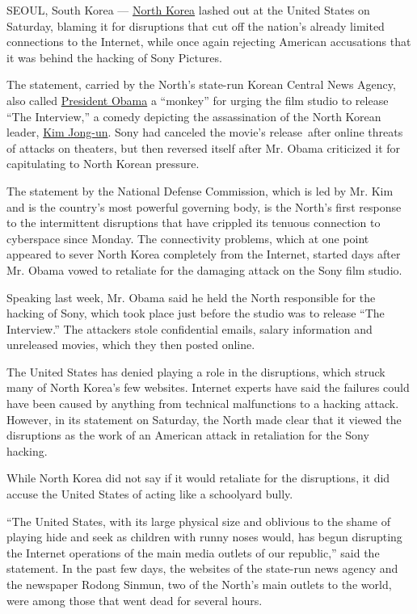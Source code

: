 SEOUL, South Korea ---
\href{http://topics.nytimes3xbfgragh.onion/top/news/international/countriesandterritories/northkorea/index.html?inline=nyt-geo}{North
Korea} lashed out at the United States on Saturday, blaming it for
disruptions that cut off the nation's already limited connections to the
Internet, while once again rejecting American accusations that it was
behind the hacking of Sony Pictures.

The statement, carried by the North's state-run Korean Central News
Agency, also called
\href{http://topics.nytimes3xbfgragh.onion/top/reference/timestopics/people/o/barack_obama/index.html?inline=nyt-per}{President
Obama} a ``monkey'' for urging the film studio to release ``The
Interview,'' a comedy depicting the assassination of the North Korean
leader,
\href{http://topics.nytimes3xbfgragh.onion/top/reference/timestopics/people/k/kim_jongun/index.html?inline=nyt-per}{Kim
Jong-un}. Sony had canceled the movie's release~after online threats of
attacks on theaters, but then reversed itself after Mr. Obama criticized
it for capitulating to North Korean pressure.

The statement by the National Defense Commission, which is led by Mr.
Kim and is the country's most powerful governing body, is the North's
first response to the intermittent disruptions that have crippled its
tenuous connection to cyberspace since Monday. The connectivity
problems, which at one point appeared to sever North Korea completely
from the Internet, started days after Mr. Obama vowed to retaliate for
the damaging attack on the Sony film studio.

Speaking last week, Mr. Obama said he held the North responsible for the
hacking of Sony, which took place just before the studio was to release
``The Interview.'' The attackers stole confidential emails, salary
information and unreleased movies, which they then posted online.

The United States has denied playing a role in the disruptions, which
struck many of North Korea's few websites. Internet experts have said
the failures could have been caused by anything from technical
malfunctions to a hacking attack. However, in its statement on Saturday,
the North made clear that it viewed the disruptions as the work of an
American attack in retaliation for the Sony hacking.

While North Korea did not say if it would retaliate for the disruptions,
it did accuse the United States of acting like a schoolyard bully.

``The United States, with its large physical size and oblivious to the
shame of playing hide and seek as children with runny noses would, has
begun disrupting the Internet operations of the main media outlets of
our republic,'' said the statement. In the past few days, the websites
of the state-run news agency and the newspaper Rodong Sinmun, two of the
North's main outlets to the world, were among those that went dead for
several hours.

